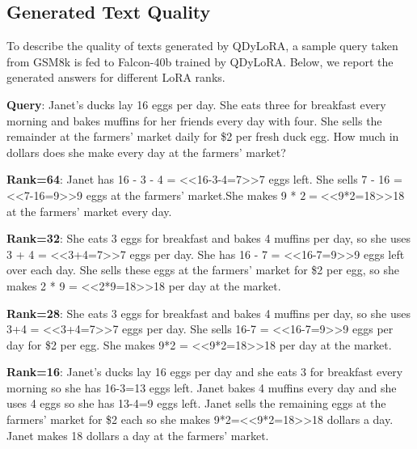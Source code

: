 \documentclass[11pt]{article}
\begin{document}
\subsection{Generated Text Quality}

To describe the quality of texts generated by QDyLoRA, a sample query taken from GSM8k is fed to Falcon-40b trained by QDyLoRA. Below, we report the generated answers for different LoRA ranks. 


\textbf{Query}: Janet's ducks lay 16 eggs per day. She eats three for breakfast every morning and bakes muffins for her friends every day with four. She sells the remainder at the farmers' market daily for \$2 per fresh duck egg. How much in dollars does she make every day at the farmers' market?

\textbf{Rank=64}: Janet has 16 - 3 - 4 = <<16-3-4=7>>7 eggs left. She sells 7 - 16 = <<7-16=9>>9 eggs at the farmers' market.She makes 9 * $2 = $<<9*2=18>>18 at the farmers' market every day.

\textbf{Rank=32}: She eats 3 eggs for breakfast and bakes 4 muffins per day, so she uses 3 + 4 = <<3+4=7>>7 eggs per day. She has 16 - 7 = <<16-7=9>>9 eggs left over each day. She sells these eggs at the farmers' market for \$2 per egg, so she makes 2 * 9 = <<2*9=18>>18 per day at the market.

\textbf{Rank=28}: She eats 3 eggs for breakfast and bakes 4 muffins per day, so she uses 3+4 = <<3+4=7>>7 eggs per day. She sells 16-7 = <<16-7=9>>9 eggs per day for \$2 per egg. She makes 9*2 = <<9*2=18>>18 per day at the market.

\textbf{Rank=16}: Janet's ducks lay 16 eggs per day and she eats 3 for breakfast every morning so she has 16-3=13 eggs left. Janet bakes 4 muffins every day and she uses 4 eggs so she has 13-4=9 eggs left. Janet sells the remaining eggs at the farmers' market for \$2 each so she makes 9*2=<<9*2=18>>18 dollars a day. Janet makes 18 dollars a day at the farmers' market.
\end{document}
